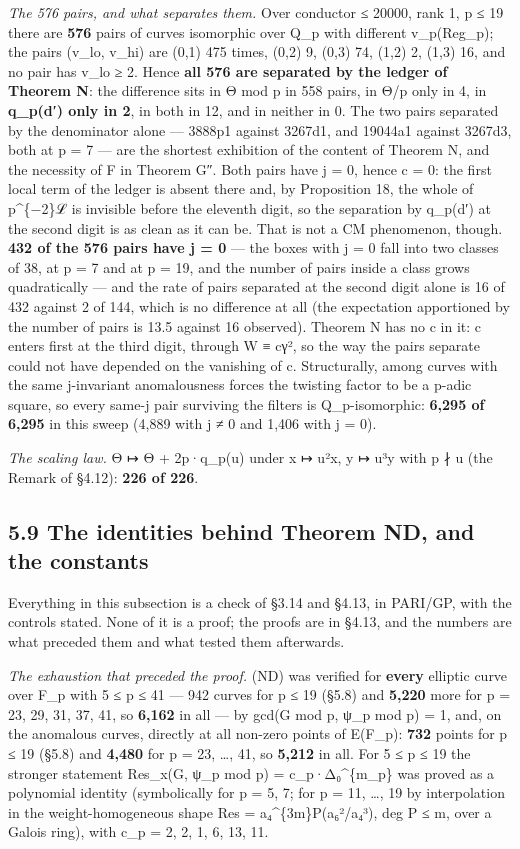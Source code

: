 \documentclass[11pt,a4paper]{article}
\theoremstyle{named}
\begin{document}
\textit{The 576 pairs, and what separates them.} Over conductor ≤ 20000, rank 1, p ≤ 19 there are \textbf{576} pairs of curves isomorphic over Q\_p with different v\_p(Reg\_p); the pairs (v\_lo, v\_hi) are (0,1) 475 times, (0,2) 9, (0,3) 74, (1,2) 2, (1,3) 16, and no pair has v\_lo ≥ 2. Hence \textbf{all 576 are separated by the ledger of Theorem N}: the difference sits in Θ mod p in 558 pairs, in Θ/p only in 4, in \textbf{q\_p(d′) only in 2}, in both in 12, and in neither in 0. The two pairs separated by the denominator alone — 3888p1 against 3267d1, and 19044a1 against 3267d3, both at p = 7 — are the shortest exhibition of the content of Theorem N, and the necessity of F in Theorem G″. Both pairs have j = 0, hence c = 0: the first local term of the ledger is absent there and, by Proposition 18, the whole of p\textasciicircum{}\{−2\}ℒ is invisible before the eleventh digit, so the separation by q\_p(d′) at the second digit is as clean as it can be. That is not a CM phenomenon, though. \textbf{432 of the 576 pairs have j = 0} — the boxes with j = 0 fall into two classes of 38, at p = 7 and at p = 19, and the number of pairs inside a class grows quadratically — and the rate of pairs separated at the second digit alone is 16 of 432 against 2 of 144, which is no difference at all (the expectation apportioned by the number of pairs is 13.5 against 16 observed). Theorem N has no c in it: c enters first at the third digit, through W ≡ cγ², so the way the pairs separate could not have depended on the vanishing of c. Structurally, among curves with the same j-invariant anomalousness forces the twisting factor to be a p-adic square, so every same-j pair surviving the filters is Q\_p-isomorphic: \textbf{6,295 of 6,295} in this sweep (4,889 with j ≠ 0 and 1,406 with j = 0).

\textit{The scaling law.} Θ ↦ Θ + 2p·q\_p(u) under x ↦ u²x, y ↦ u³y with p ∤ u (the Remark of §4.12): \textbf{226 of 226}.

\subsection*{5.9 The identities behind Theorem ND, and the constants}

Everything in this subsection is a check of §3.14 and §4.13, in PARI/GP, with the controls stated. None of it is a proof; the proofs are in §4.13, and the numbers are what preceded them and what tested them afterwards.

\textit{The exhaustion that preceded the proof.} (ND) was verified for \textbf{every} elliptic curve over F\_p with 5 ≤ p ≤ 41 — 942 curves for p ≤ 19 (§5.8) and \textbf{5,220} more for p = 23, 29, 31, 37, 41, so \textbf{6,162} in all — by gcd(G mod p, ψ\_p mod p) = 1, and, on the anomalous curves, directly at all non-zero points of E(F\_p): \textbf{732} points for p ≤ 19 (§5.8) and \textbf{4,480} for p = 23, …, 41, so \textbf{5,212} in all. For 5 ≤ p ≤ 19 the stronger statement Res\_x(G, ψ\_p mod p) = c\_p·Δ₀\textasciicircum{}\{m\_p\} was proved as a polynomial identity (symbolically for p = 5, 7; for p = 11, …, 19 by interpolation in the weight-homogeneous shape Res = a₄\textasciicircum{}\{3m\}P(a₆²/a₄³), deg P ≤ m, over a Galois ring), with c\_p = 2, 2, 1, 6, 13, 11.
\end{document}
